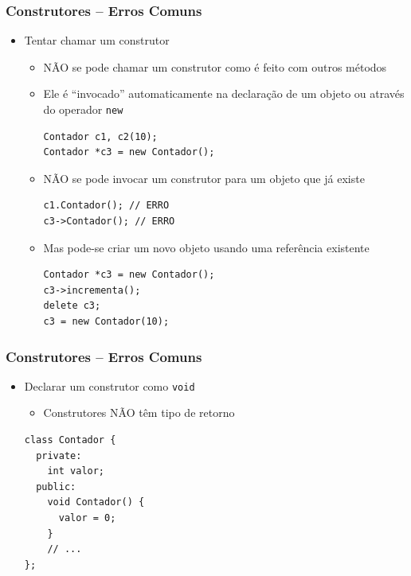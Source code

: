 \documentclass[aspectratio=169]{beamer}
\begin{document}
\begin{frame}[fragile]\frametitle{Construtores -- Erros Comuns}
\begin{itemize}
	\item Tentar chamar um construtor
	\begin{itemize}
		\item NÃO se pode chamar um construtor como é feito com outros métodos
		\item Ele é ``invocado'' automaticamente na declaração de um objeto ou através do operador \texttt{new}
\begin{lstlisting}
Contador c1, c2(10);
Contador *c3 = new Contador();
\end{lstlisting}
		\item NÃO se pode invocar um construtor para um objeto que já existe
\begin{lstlisting}
c1.Contador(); // ERRO
c3->Contador(); // ERRO
\end{lstlisting}
		\item Mas pode-se criar um novo objeto usando uma referência existente
\begin{lstlisting}
Contador *c3 = new Contador();
c3->incrementa();
delete c3;
c3 = new Contador(10);
\end{lstlisting}
	\end{itemize}
\end{itemize}
\end{frame}

\begin{frame}[fragile]\frametitle{Construtores -- Erros Comuns}
\begin{itemize}
	\item Declarar um construtor como \texttt{void}
	\begin{itemize}
		\item Construtores NÃO têm tipo de retorno
	\end{itemize}
\begin{lstlisting}
class Contador {
  private:
    int valor;
  public:
    void Contador() {
      valor = 0;
    }
    // ...
};
\end{lstlisting}
\end{itemize}
\end{frame}
\end{document}
